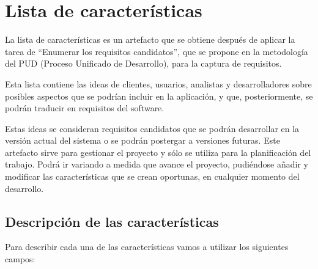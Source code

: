 \section{Lista de características} %
\label{sec:lista_de_caracteristicas}

	La lista de características es un artefacto que se obtiene después de aplicar la tarea de “Enumerar los requisitos candidatos”, que se propone en la metodología del PUD (Proceso Unificado de Desarrollo), para la captura de requisitos. 

		Esta lista contiene las ideas de clientes, usuarios, analistas y desarrolladores sobre posibles aspectos que se podrían incluir en la aplicación, y que, posteriormente, se podrán traducir en requisitos del software. 

		Estas ideas se consideran requisitos candidatos que se podrán desarrollar en la versión actual del sistema o se podrán postergar a versiones futuras. Este artefacto sirve para gestionar el proyecto y sólo se utiliza para la planificación del trabajo. Podrá ir variando a medida que avance el proyecto, pudiéndose añadir y modificar las características que se crean oportunas, en cualquier momento del desarrollo.

	\subsection{Descripción de las características}
	Para describir cada una de las características vamos a utilizar los siguientes campos:

